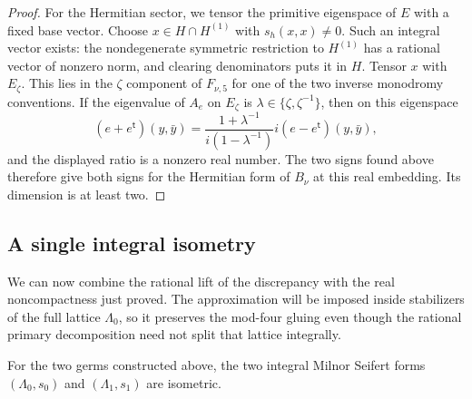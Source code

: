 \begin{proof}
For the Hermitian sector, we tensor the primitive eigenspace of $E$
with a fixed base vector. Choose $x\in H\cap H^{(1)}$ with $s_h(x,x)\ne0$.
Such an integral vector exists: the nondegenerate symmetric
restriction to $H^{(1)}$ has a rational vector of nonzero norm, and
clearing denominators puts it in $H$. Tensor $x$ with $E_\zeta$.
This lies in the
$\zeta$ component of $F_{\nu,5}$ for one of the two inverse
monodromy conventions.  If the eigenvalue of $A_e$ on $E_\zeta$
is $\lambda\in\{\zeta,\zeta^{-1}\}$, then on this eigenspace
\[
 (e+e^{\mathsf t})(y,\bar y)
 =\frac{1+\lambda^{-1}}{i(1-\lambda^{-1})}
       i(e-e^{\mathsf t})(y,\bar y),
\]
and the displayed ratio is a nonzero real number.  The two signs
found above therefore give both signs for the Hermitian form of
$B_\nu$ at this real embedding.  Its dimension is at least two.
\end{proof}

\subsection{A single integral isometry}\label{subsec:arith-approximation}

We can now combine the rational lift of the discrepancy with the real
noncompactness just proved. The approximation will be imposed inside
stabilizers of the full lattice $\Lambda_0$, so it preserves the
mod-four gluing even though the rational primary decomposition need
not split that lattice integrally.

\begin{proposition}
\label{prop:arith-integral-congruence}
For the two germs constructed above, the two integral Milnor Seifert
forms $(\Lambda_0,s_0)$ and $(\Lambda_1,s_1)$ are isometric.
\end{proposition}

